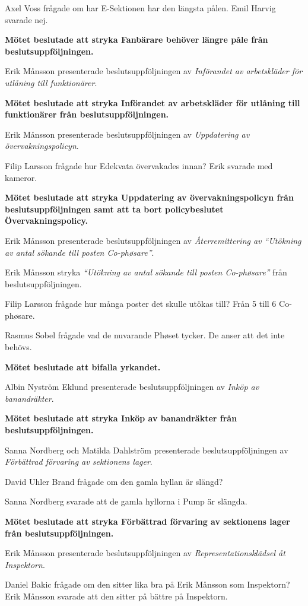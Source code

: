 \documentclass[10pt]{article}
\begin{document}
\begin{paragrafer}
Axel Voss frågade om har E-Sektionen har den längsta pålen. Emil Harvig svarade nej.

\textbf{Mötet beslutade att stryka Fanbärare behöver längre påle från beslutsuppföljningen.}

Erik Månsson presenterade beslutsuppföljningen av \emph{Införandet av arbetskläder för utlåning till funktionärer}.

\textbf{Mötet beslutade att stryka Införandet av arbetskläder för utlåning till funktionärer från beslutsuppföljningen.}

Erik Månsson presenterade beslutsuppföljningen av \emph{Uppdatering av övervakningspolicyn}.

Filip Larsson frågade hur Edekvata övervakades innan? Erik svarade med kameror.

\textbf{Mötet beslutade att stryka Uppdatering av övervakningspolicyn från beslutsuppföljningen samt att ta bort policybeslutet Övervakningspolicy.}

Erik Månsson presenterade beslutsuppföljningen av \emph{Återremittering av
``Utökning av antal sökande till posten Co-phøsare''}.

Erik Månsson \ypa stryka \emph{``Utökning av antal sökande till posten Co-phøsare''} från beslutsuppföljningen.

Filip Larsson frågade hur många poster det skulle utökas till? Från 5 till 6 Co-phøsare.

Rasmus Sobel frågade vad de nuvarande Phøset tycker. De anser att det inte behövs.

\textbf{Mötet beslutade att bifalla yrkandet.}

Albin Nyström Eklund presenterade beslutsuppföljningen av \emph{Inköp av banandräkter}.

\textbf{Mötet beslutade att stryka Inköp av banandräkter från beslutsuppföljningen.}

Sanna Nordberg och Matilda Dahlström presenterade beslutsuppföljningen av \emph{Förbättrad förvaring av sektionens lager}.

David Uhler Brand frågade om den gamla hyllan är slängd?

Sanna Nordberg svarade att de gamla hyllorna i Pump är slängda.

\textbf{Mötet beslutade att stryka Förbättrad förvaring av sektionens lager från beslutsuppföljningen.}

Erik Månsson presenterade beslutsuppföljningen av \emph{Representationsklädsel åt Inspektorn}.

Daniel Bakic frågade om den sitter lika bra på Erik Månsson som Inspektorn? Erik Månsson svarade att den sitter på bättre på Inspektorn.


\end{paragrafer}
\end{document}
